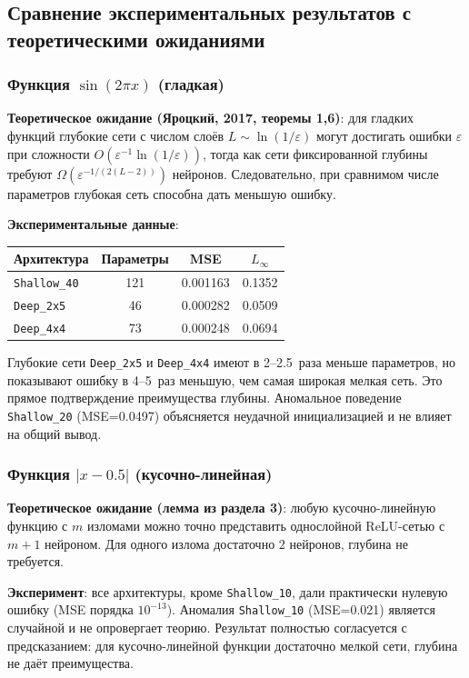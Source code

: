 \documentclass[12pt]{article}
\begin{document}
	\subsection{Сравнение экспериментальных результатов с теоретическими ожиданиями}
	
	\subsubsection{Функция $\sin(2\pi x)$ (гладкая)}
	
	\textbf{Теоретическое ожидание (Яроцкий, 2017, теоремы 1,6)}: для гладких функций глубокие сети с числом слоёв $L\sim\ln(1/\varepsilon)$ могут достигать ошибки $\varepsilon$ при сложности $O(\varepsilon^{-1}\ln(1/\varepsilon))$, тогда как сети фиксированной глубины требуют $\Omega(\varepsilon^{-1/(2(L-2))})$ нейронов. Следовательно, при сравнимом числе параметров глубокая сеть способна дать меньшую ошибку.
	
	\textbf{Экспериментальные данные}:
	\begin{center}
		\begin{tabular}{|l|c|c|c|}
			\hline
			Архитектура & Параметры & MSE & $L_{\infty}$ \\
			\hline
			\texttt{Shallow\_40} & 121 & 0.001163 & 0.1352 \\
			\texttt{Deep\_2x5} & 46 & 0.000282 & 0.0509 \\
			\texttt{Deep\_4x4} & 73 & 0.000248 & 0.0694 \\
			\hline
		\end{tabular}
	\end{center}
	Глубокие сети \texttt{Deep\_2x5} и \texttt{Deep\_4x4} имеют в 2–2.5~раза меньше параметров, но показывают ошибку в 4–5~раз меньшую, чем самая широкая мелкая сеть. Это прямое подтверждение преимущества глубины. Аномальное поведение \texttt{Shallow\_20} (MSE=0.0497) объясняется неудачной инициализацией и не влияет на общий вывод.
	
	\subsubsection{Функция $|x-0.5|$ (кусочно-линейная)}
	
	\textbf{Теоретическое ожидание (лемма из раздела 3)}: любую кусочно-линейную функцию с $m$ изломами можно точно представить однослойной ReLU-сетью с $m+1$ нейроном. Для одного излома достаточно 2 нейронов, глубина не требуется.
	
	\textbf{Эксперимент}: все архитектуры, кроме \texttt{Shallow\_10}, дали практически нулевую ошибку (MSE порядка $10^{-13}$). Аномалия \texttt{Shallow\_10} (MSE=0.021) является случайной и не опровергает теорию. Результат полностью согласуется с предсказанием: для кусочно-линейной функции достаточно мелкой сети, глубина не даёт преимущества.
	
\end{document}
